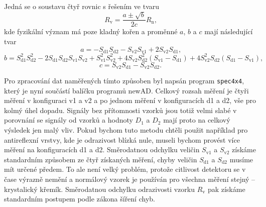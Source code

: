 Jedná se o soustavu čtyř rovnic s řešením ve tvaru
\begin{equation}
R_\mathrm{v} = \frac{a \pm \sqrt{b}}{2c} R_\mathrm{n} \text{,}
\end{equation}
kde fyzikální význam má poze kladný kořen a proměnné $a$, $b$ a $c$ mají následující tvar
\begin{equation}
a = -S_\mathrm{d1} S_\mathrm{d2} - S_\mathrm{v2} S_\mathrm{v1} + 2 S_\mathrm{v2} S_\mathrm{d1} \text{,}
\end{equation}
\begin{equation}
b = S_\mathrm{d1}^2 S_\mathrm{d2}^2 - 2 S_\mathrm{d1} S_\mathrm{d2} S_\mathrm{v1} S_\mathrm{v2} 
				+ S_\mathrm{v1}^2 S_\mathrm{v2}^2 + 4 S_\mathrm{v2} S_\mathrm{d2}^2 (S_\mathrm{v1} - S_\mathrm{d1}) 
				+ 4 S_\mathrm{v2}^2 S_\mathrm{d2} (S_\mathrm{d1} - S_\mathrm{v1}) \text{,}
\end{equation}
\begin{equation}
c = S_\mathrm{v2} S_\mathrm{d1} - S_\mathrm{v2} S_\mathrm{d2} \text{.}
\end{equation}

Pro zpracování dat naměřených tímto způsoben byl napsán program \texttt{spec4x4}, který je nyní součástí balíčku programů newAD. Celkový rozsah měření je čtyři měření v konfiguraci v1 a v2 a po jednom měření v konfiguracích d1 a d2, vše pro kolmý úhel dopadu. Signály bez přítomnosti vzorků jsou totiž velmi slabé v porovnání se signály od vzorků a hodnoty $D_1$ a $D_2$ mají proto na celkový výsledek jen malý vliv. 
Pokud bychom tuto metodu chtěli použit například pro antireflexní vrstvy, kde je odrazivost blízká nule, museli bychom provést více měření na konfiguracích d1 a d2. 
Směrodatnou odchylku veličin $S_\mathrm{v1}$ a $S_\mathrm{v2}$ získáme standardním způsobem ze čtyř získaných měření, chyby veličin $S_\mathrm{d1}$ a $S_\mathrm{d2}$ musíme mít určené předem. To ale není velký problém, protože citlivost detektoru se v čase výrazně nemění a normálový vzorek je používán pro všechna měření stejný -- krystalický křemík. 
Směrodatnou odchylku odrazivosti vzorku $R_\mathrm{v}$ pak získáme standardním postupem podle zákona šíření chyb.

